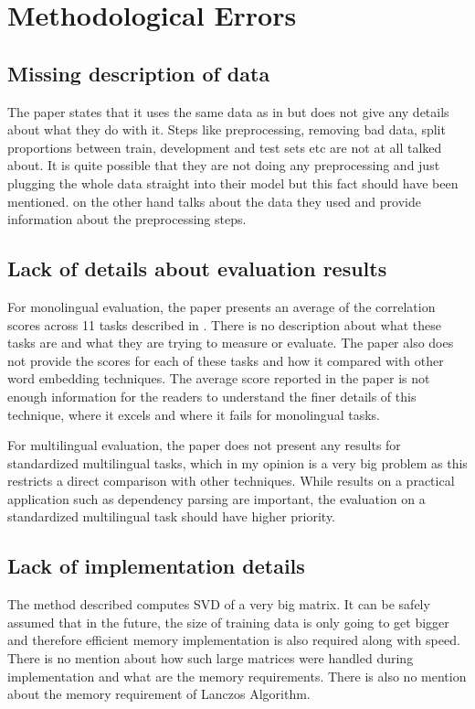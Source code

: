 \documentclass[11pt]{article}
\begin{document}
\section{Methodological Errors}
\subsection{Missing description of data} \label{missingdata}
The paper states that it uses the same data as in \cite{faruqui2014improving} but does not give any details about what they do with it. Steps like preprocessing, removing bad data, split proportions between train, development and test sets etc are not at all talked about. It is quite possible that they are not doing any preprocessing and just plugging the whole data straight into their model but this fact should have been mentioned. \cite{faruqui2014improving} on the other hand talks about the data they used and provide information about the preprocessing steps.

\subsection{Lack of details about evaluation results}
For monolingual evaluation, the paper presents an average of the correlation scores across 11 tasks described in \cite{faruqui2014community}. There is no description about what these tasks are and what they are trying to measure or evaluate. The paper also does not provide the scores for each of these tasks and how it compared with other word embedding techniques. The average score reported in the paper is not enough information for the readers to understand the finer details of this technique, where it excels and where it fails for monolingual tasks.

For multilingual evaluation, the paper does not present any results for standardized multilingual tasks, which in my opinion is a very big problem as this restricts a direct comparison with other techniques. While results on a practical application such as dependency parsing are important, the evaluation on a standardized multilingual task should have higher priority.

\subsection{Lack of implementation details}
The method described computes SVD of a very big matrix. It can be safely assumed that in the future, the size of training data is only going to get bigger and therefore efficient memory implementation is also required along with speed. There is no mention about how such large matrices were handled during implementation and what are the memory requirements. There is also no mention about the memory requirement of Lanczos Algorithm.
\end{document}
